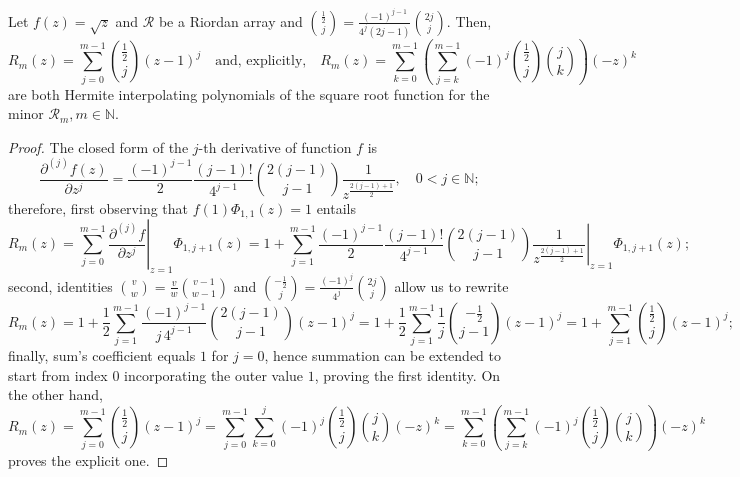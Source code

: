 
\begin{theorem}
\label{thm:sqrt-Hermite-interpolating-poly-implicit}
Let $f(z)=\sqrt{z}$ and $\mathcal{R}$ be a Riordan array and
${\frac{1}{2}\choose {j}} = \frac{(-1)^{j-1}}{4^{j}(2j-1)}{ {2j}\choose{j} }$.
Then,
\begin{equation}
  \label{eq:sqrt-Hermite-interpolating-poly}
  R_{m}(z) = \sum_{j=0}^{m-1}{{\frac{1}{2} \choose j}\left(z-1\right)^{j}}
  \quad\text{and, explicitly,}\quad
  R_{m}(z) = \sum_{k=0}^{m-1}{\left(\sum_{j=k}^{m-1}{(-1)^{j}{{\frac{1}{2}}\choose{j}}{{j}\choose{k}}}\right)(-z)^{k}}
\end{equation}
are both Hermite interpolating polynomials of the square root function for the minor
$\mathcal{R}_{m}, m\in\mathbb{N}$.
\end{theorem}

\begin{proof}
The closed form of the $j$-th derivative of function $f$ is 
\begin{displaymath}
\frac{\partial^{(j)}{f}(z)}{\partial{z}^{j}} =\frac{(-1)^{j-1}}{2}\frac{(j-1)!}{4^{j-1}}{{2(j-1)}\choose{j-1}}\frac{1}{z^{\frac{2(j-1)+1}{2}}}, \quad 0 < j \in\mathbb{N};
\end{displaymath}
therefore, first observing that $f(1)\Phi_{1,1}(z)=1$ entails
\begin{displaymath}
  R_{m}(z) = \sum_{j=0}^{m-1}{ \left. \frac{\partial^{(j)}{f}}{\partial{z}^{j}} \right|_{z=1}\Phi_{1,j+1}(z)}
       = 1 + \sum_{j=1}^{m-1}{ \left. \frac{(-1)^{j-1}}{2}\frac{(j-1)!}{4^{j-1}}{{2(j-1)}\choose{j-1}}\frac{1}{z^{\frac{2(j-1)+1}{2}}} \right|_{z=1}\Phi_{1,j+1}(z)};
\end{displaymath}
second, identities ${ {v}\choose{w}} = \frac{v}{w} { {v-1}\choose{w-1} }$ and 
${ {-\frac{1}{2}}\choose{j} } = \frac{(-1)^{j}}{4^{j}}{ {2j}\choose{j} }$ allow us
to rewrite
\begin{displaymath}
  R_{m}(z) = 1 + \frac{1}{2}\sum_{j=1}^{m-1}{ \frac{(-1)^{j-1}}{j\,4^{j-1}}{{2(j-1)}\choose{j-1}} \left(z-1\right)^{j}}
       = 1 + \frac{1}{2}\sum_{j=1}^{m-1}{ \frac{1}{j}{-\frac{1}{2}\choose{j-1}} \left(z-1\right)^{j}}
       = 1 + \sum_{j=1}^{m-1}{ {\frac{1}{2}\choose{j}} \left(z-1\right)^{j}};
\end{displaymath}
finally, sum's coefficient equals $1$ for $j=0$, hence summation can be
extended to start from index $0$ incorporating the outer value $1$, proving the
first identity.  On the other hand,
\begin{displaymath}
  R_{m}(z) = \sum_{j=0}^{m-1}{ {\frac{1}{2}\choose{j}} \left(z-1\right)^{j}}
       = \sum_{j=0}^{m-1}{\sum_{k=0}^{j}{(-1)^{j}{\frac{1}{2}\choose{j}}{ {j}\choose{k} } \left(-z\right)^{k}}}
       = \sum_{k=0}^{m-1}{\left(\sum_{j=k}^{m-1}{(-1)^{j}{\frac{1}{2}\choose{j}}{ {j}\choose{k} } }\right)\left(-z\right)^{k}}
\end{displaymath}
proves the explicit one.
\end{proof}

